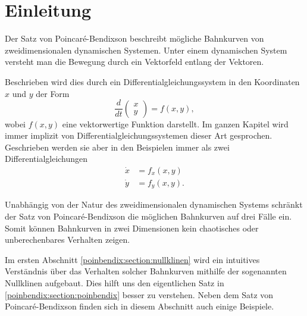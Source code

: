 \section{Einleitung} \label{poinbendix:section:einleitung}

Der Satz von Poincaré-Bendixson beschreibt mögliche Bahnkurven von zweidimensionalen dynamischen Systemen.
Unter einem dynamischen System versteht man die Bewegung durch ein Vektorfeld entlang der Vektoren.

Beschrieben wird dies durch ein Differentialgleichungssystem in den Koordinaten $x$ und $y$ der Form
\begin{equation*}
\frac{d}{dt}
\begin{pmatrix}x\\y\end{pmatrix}
=
f(x,y),
\end{equation*}
wobei $f(x,y)$ eine vektorwertige Funktion darstellt.
Im ganzen Kapitel wird immer implizit von Differentialgleichungssystemen dieser Art gesprochen.
Geschrieben werden sie aber in den Beispielen immer als zwei Differentialgleichungen
\begin{align*}
    \dot{x} &= f_x(x, y) \\
    \dot{y} &= f_y(x, y).
\end{align*}

Unabhängig von der Natur des zweidimensionalen dynamischen Systems schränkt der Satz von Poincaré-Bendixson die möglichen Bahnkurven auf drei Fälle ein.
Somit können Bahnkurven in zwei Dimensionen kein chaotisches oder unberechenbares Verhalten zeigen.

Im ersten Abschnitt \ref{poinbendix:section:nullklinen} wird ein intuitives Verständnis über das Verhalten solcher Bahnkurven mithilfe der sogenannten Nullklinen aufgebaut.
Dies hilft uns den eigentlichen Satz in \ref{poinbendix:section:poinbendix} besser zu verstehen.
Neben dem Satz von Poincaré-Bendixson finden sich in diesem Abschnitt auch einige Beispiele.
